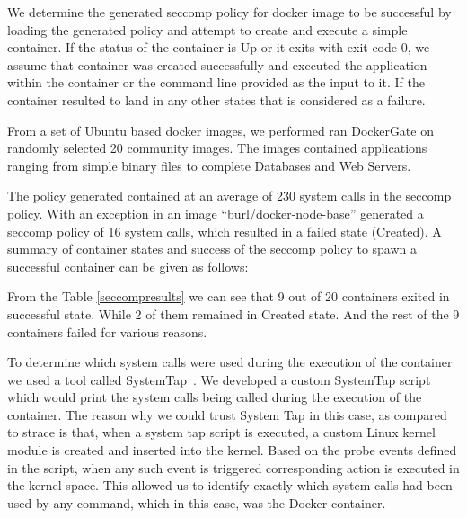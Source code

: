 We determine the generated seccomp policy for docker image to be successful by loading the generated policy and attempt to create and execute a simple container. If the status of the container is Up or it exits with exit code 0, we assume that container was created successfully and executed the application within the container or the command line provided as the input to it. If the container resulted to land in any other states that is considered as a failure.

From a set of Ubuntu based docker images, we performed ran DockerGate on randomly selected 20 community images. The images contained applications ranging from simple binary files to complete Databases and Web Servers.

The policy generated contained at an average of 230 system calls in the seccomp policy. With an exception in an image “burl/docker-node-base” generated a seccomp policy of 16 system calls, which resulted in a failed state (Created).
A summary of container states and success of the seccomp policy to spawn a successful container can be given as follows:

\begin{table}
\centering
\label{seccompresults}
\caption{Container status after loading them with DockerGate generated seccomp policy}
\end{table}


From the Table \ref{seccompresults} we can see that 9 out of 20 containers exited in successful state. While 2 of them remained in Created state. And the rest of the 9 containers failed for various reasons.

To determine which system calls were used during the execution of the container we used a tool called SystemTap~\cite{systemtap}. We developed a custom SystemTap script which would print the system calls being called during the execution of the container. The reason why we could trust System Tap in this case, as compared to strace is that, when a system tap script is executed, a custom Linux kernel module is created and inserted into the kernel. Based on the probe events defined in the script, when any such event is triggered corresponding action is executed in the kernel space. This allowed us to identify exactly which system calls had been used by any command, which in this case, was the Docker container. 

